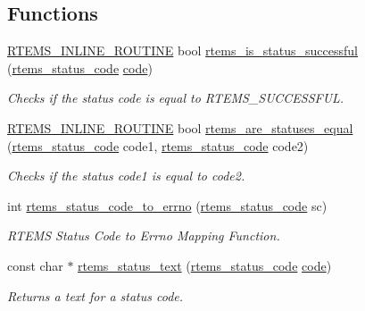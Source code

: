 \subsection*{Functions}
\begin{DoxyCompactItemize}
\item 
\mbox{\hyperlink{group__RTEMSScoreBaseDefs_gac216239df231d5dbd15e3520b0b9313f}{R\+T\+E\+M\+S\+\_\+\+I\+N\+L\+I\+N\+E\+\_\+\+R\+O\+U\+T\+I\+NE}} bool \mbox{\hyperlink{group__ClassicStatus_ga66b6a30382adff21abd134ac07c9082d}{rtems\+\_\+is\+\_\+status\+\_\+successful}} (\mbox{\hyperlink{group__ClassicStatus_ga545d41846817eaba6143d52ee4d9e9fe}{rtems\+\_\+status\+\_\+code}} \mbox{\hyperlink{structcode}{code}})
\begin{DoxyCompactList}\small\item\em Checks if the status code is equal to R\+T\+E\+M\+S\+\_\+\+S\+U\+C\+C\+E\+S\+S\+F\+UL. \end{DoxyCompactList}\item 
\mbox{\hyperlink{group__RTEMSScoreBaseDefs_gac216239df231d5dbd15e3520b0b9313f}{R\+T\+E\+M\+S\+\_\+\+I\+N\+L\+I\+N\+E\+\_\+\+R\+O\+U\+T\+I\+NE}} bool \mbox{\hyperlink{group__ClassicStatus_ga03ee20b648f928cca7000c510d137a5e}{rtems\+\_\+are\+\_\+statuses\+\_\+equal}} (\mbox{\hyperlink{group__ClassicStatus_ga545d41846817eaba6143d52ee4d9e9fe}{rtems\+\_\+status\+\_\+code}} code1, \mbox{\hyperlink{group__ClassicStatus_ga545d41846817eaba6143d52ee4d9e9fe}{rtems\+\_\+status\+\_\+code}} code2)
\begin{DoxyCompactList}\small\item\em Checks if the status code1 is equal to code2. \end{DoxyCompactList}\item 
int \mbox{\hyperlink{group__ClassicStatus_ga79ad1aab94c60408607b3d0cd36a3b24}{rtems\+\_\+status\+\_\+code\+\_\+to\+\_\+errno}} (\mbox{\hyperlink{group__ClassicStatus_ga545d41846817eaba6143d52ee4d9e9fe}{rtems\+\_\+status\+\_\+code}} sc)
\begin{DoxyCompactList}\small\item\em R\+T\+E\+MS Status Code to Errno Mapping Function. \end{DoxyCompactList}\item 
const char $\ast$ \mbox{\hyperlink{group__ClassicStatus_ga2266bf8df3365634df546ace2d0f1146}{rtems\+\_\+status\+\_\+text}} (\mbox{\hyperlink{group__ClassicStatus_ga545d41846817eaba6143d52ee4d9e9fe}{rtems\+\_\+status\+\_\+code}} \mbox{\hyperlink{structcode}{code}})
\begin{DoxyCompactList}\small\item\em Returns a text for a status code. \end{DoxyCompactList}\end{DoxyCompactItemize}


